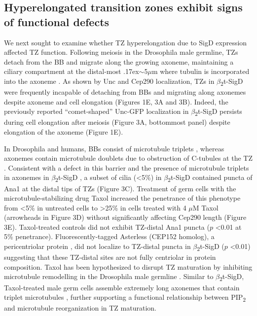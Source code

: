 \documentclass[12pt, twoside, letterpaper]{article}
\newcommand{\PIP}{PIP\textsubscript{2}}
\newcommand{\sigd}{$\beta$\textsubscript{2}t-SigD}
\begin{document}
\begin{doublespacing}
\begin{linenumbers}
    \subsection*{Hyperelongated transition zones exhibit signs of functional defects}
    We next sought to examine whether TZ hyperelongation due to SigD expression
    affected TZ function.
    Following meiosis in the Drosophila male germline, TZs detach from
    the BB and migrate along the growing axoneme, maintaining a ciliary compartment
    at the distal-most {\raise.17ex\hbox{$\scriptstyle\sim$}}5$\mu$m where tubulin
    is incorporated into the axoneme
    \citep{basiri2014migrating, fabian2012drosophila}.
    As shown by Unc and Cep290 localization,
    TZs in \sigd{} were frequently incapable of detaching from
    BBs and migrating along axonemes despite
    axoneme and cell elongation
    (Figures 1E, 3A and 3B).
    Indeed, the previously reported ``comet-shaped'' Unc-GFP localization in \sigd{}
    \citep{wei2008depletion}
    persists during cell elongation after meiosis
    (Figure 3A, bottommost panel)
    despite elongation of the axoneme (Figure 1E).

    In Drosophila and humans, BBs consist of microtubule triplets
    \citep{jana2016drosophila, lattao2017centrioles},
    whereas axonemes contain microtubule doublets due to obstruction of
    C-tubules at the TZ \citep{gottardo2013cilium}.
    Consistent with a defect in this barrier and the presence of
    microtubule triplets in axonemes in \sigd{} \citep{wei2008depletion},
    a subset of cilia (<5\%) in \sigd{}
    contained puncta of Ana1 at the distal
    tips of TZs (Figure 3C).
    Treatment of germ cells with the microtubule-stabilizing drug
    Taxol increased the penetrance of this phenotype from <5\% in untreated cells
    to \textgreater25\% in cells treated with 4 $\mu$M Taxol (arrowheads in Figure 3D)
    without significantly affecting Cep290 length (Figure 3E).
    Taxol-treated controls did not exhibit TZ-distal Ana1 puncta ($p$ <0.01 at 5\% penetrance).
    Fluorescently-tagged Asterless (CEP152 homolog), a pericentriolar protein
    \citep{blachon2008drosophila, dzhindzhev2010asterless},
    did not localize to TZ-distal puncta in \sigd{} ($p$ <0.01)
    suggesting that these TZ-distal
    sites are not fully centriolar in protein composition.
    Taxol has been hypothesized to disrupt TZ maturation
    by inhibiting microtubule remodelling in the Drosophila male germline \citep{riparbelli2012assembly, riparbelli2013unique}.
    Similar to \sigd{},
    Taxol-treated male germ cells assemble extremely long axonemes
    that contain triplet microtubules
    \citep{riparbelli2013unique}, further supporting a functional relationship between
    \PIP{} and microtubule reorganization in TZ maturation.


\end{linenumbers}
\end{doublespacing}
\end{document}
